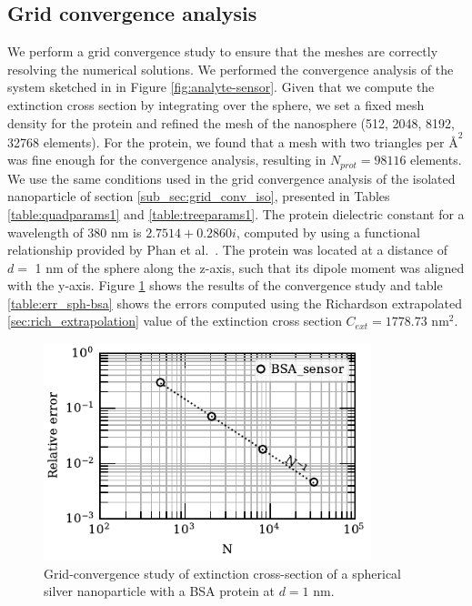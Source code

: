 \subsection{Grid convergence analysis} \label{sec:grid_conv_bsa}
We perform a grid convergence study to ensure that the meshes are correctly
resolving the numerical solutions. We performed the convergence analysis of
the system sketched in in Figure \ref{fig:analyte-sensor}. Given that we 
compute the extinction cross section by integrating over the sphere, we set 
a fixed mesh density for the protein and refined the mesh of the nanosphere 
(512, 2048, 8192, 32768 elements). For the protein, we found that a mesh with
two triangles per $\text{\AA}^2$ was fine enough for the convergence 
analysis, resulting in $N_{prot} = 98116$ elements.
We use the same conditions used in the grid convergence analysis of the 
isolated nanoparticle of section \ref{sub_sec:grid_conv_iso}, presented
in Tables \ref{table:quadparams1} and \ref{table:treeparams1}. The protein 
dielectric constant for a wavelength of 380 nm is $2.7514 + 0.2860 i$,   
computed by using a functional relationship provided by Phan
 et al.~\cite{PhanETal2013}. The protein was located at a distance of 
 $d=$ 1 nm of the sphere along the z-axis, such that its dipole moment 
 was aligned with the y-axis. Figure  \ref{fig:err_sph-bsa} shows the results of the convergence study and 
 table \ref{table:err_sph-bsa} shows the errors computed using the Richardson extrapolated
\ref{sec:rich_extrapolation} value of the extinction cross section $C_{ext}= 1778.73$ nm$^2$.

\begin{figure}%
    \centering
    \includegraphics[width=0.85\textwidth]{convergence_bsa_sensor_R8_d1_w380.pdf} 
    \caption{Grid-convergence study of extinction cross-section of a spherical silver
             nanoparticle with a BSA protein at $d=1$ nm.}
    \label{fig:err_sph-bsa}
 \end{figure}

